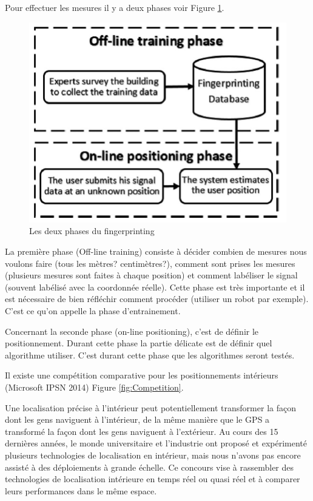 Pour effectuer les mesures il y a deux phases voir Figure \ref{fig:Fingerprinting}. 

\begin{figure}[htp]
 \begin{center}
  \includegraphics[scale=1]{figures/Fingerprinting.png}
  \caption{Les deux phases du fingerprinting}
  \label{fig:Fingerprinting} %
 \end{center}
\end{figure}

La première phase (Off-line training) consiste à décider combien de mesures nous voulons faire (tous les mètres? centimètres?), comment sont prises les mesures (plusieurs mesures sont faites à chaque position) et comment labéliser le signal (souvent labélisé avec la coordonnée réelle). Cette phase est très importante et il est nécessaire de bien réfléchir comment procéder (utiliser un robot par exemple). C'est ce qu'on appelle la phase d'entrainement.

Concernant la seconde phase (on-line positioning), c'est de définir le positionnement. Durant cette phase la partie délicate est de définir quel algorithme utiliser. C'est durant cette phase que les algorithmes seront testés. 

Il existe une compétition comparative pour les positionnements intérieurs (Microsoft IPSN 2014) Figure \ref{fig:Competition}.

Une localisation précise à l'intérieur peut potentiellement transformer la façon dont les gens naviguent à l'intérieur, de la même manière que le GPS a transformé la façon dont les gens naviguent à l'extérieur. Au cours des 15 dernières années, le monde universitaire et l’industrie ont proposé et expérimenté plusieurs technologies de localisation en intérieur, mais nous n’avons pas encore assisté à des déploiements à grande échelle. Ce concours vise à rassembler des technologies de localisation intérieure en temps réel ou quasi réel et à comparer leurs performances dans le même espace. \cite{MICRO}

